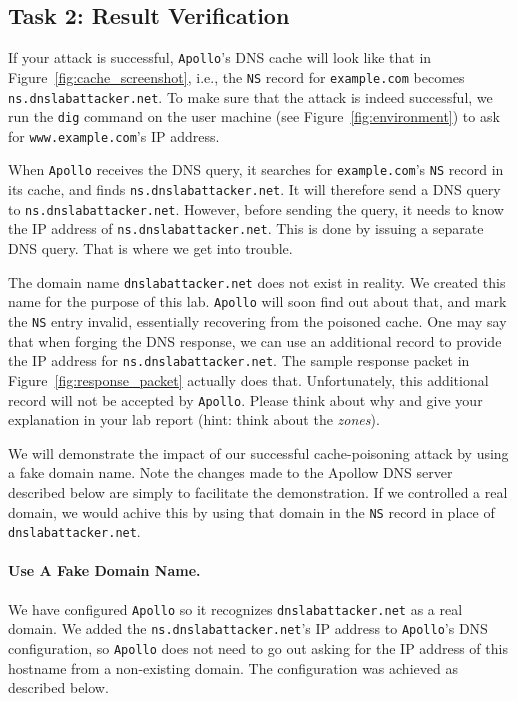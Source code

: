 \subsection{Task 2: Result Verification}


If your attack is successful, {\tt Apollo}'s DNS cache will look like 
that in Figure~\ref{fig:cache_screenshot}, i.e., the {\tt NS} record 
for {\tt example.com} becomes {\tt ns.dnslabattacker.net}. To make sure
that the attack is indeed successful, we run the {\tt dig} command 
on the user machine (see Figure~\ref{fig:environment}) to 
ask for {\tt www.example.com}'s IP address. 

When {\tt Apollo} receives the DNS query, it searches
for {\tt example.com}'s {\tt NS} record in its cache,
and finds {\tt ns.dnslabattacker.net}.
It will therefore send a DNS query to {\tt ns.dnslabattacker.net}.
However, before sending the query, it needs to know the IP address of 
{\tt ns.dnslabattacker.net}. This is done by issuing a separate DNS query. 
That is where we get into trouble.


The domain name {\tt dnslabattacker.net} does not exist in reality.
We created this name for the purpose of this lab. {\tt Apollo} will soon
find out about that, and mark the {\tt NS} entry invalid, essentially recovering 
from the poisoned cache. One may say that when forging the DNS response, we
can use an additional record to provide the IP address for 
{\tt ns.dnslabattacker.net}. The sample response packet in 
Figure~\ref{fig:response_packet} actually does that. Unfortunately,
this additional record will not be accepted by {\tt Apollo}. Please think
about why and give your explanation in your lab report (hint: think
about the {\em zones}).

We will demonstrate the impact
of our successful cache-poisoning attack by using a fake domain name.
Note the changes made to the Apollow DNS server described below are simply
to facilitate the demonstration. If we controlled a real domain, we would achive
this by using that domain in the {\tt NS} record in place of {\tt dnslabattacker.net}.

\paragraph{Use A Fake Domain Name.}
We have configured {\tt Apollo} so
it recognizes {\tt dnslabattacker.net} as a real domain. We added
the {\tt ns.dnslabattacker.net}'s IP address to {\tt Apollo}'s DNS configuration,
so {\tt Apollo} does not need to go out asking for the IP address of this
hostname from a non-existing domain. The configuration was achieved as described
below.

